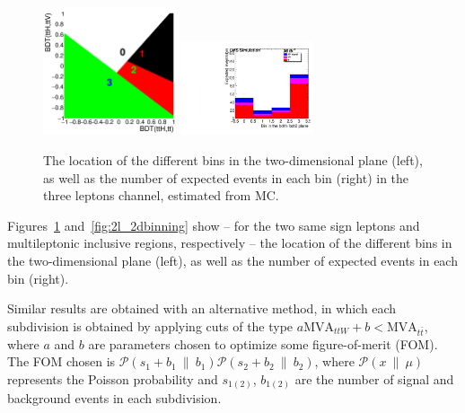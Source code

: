 \begin{figure}[htb]
	\centering
        \includegraphics[width=0.35\textwidth]{plots_extraction/binning/3l/voronoi_3l}
        \includegraphics[width=0.35\textwidth,height=0.35\textwidth]{plots_extraction/binning/3l/recursive_3l}
        \caption{The location of the different bins in the two-dimensional plane (left), as well as the number of expected events in each bin (right) in the three leptons channel, estimated from MC.}
	\label{fig:3l_2dbinning}
\end{figure}

Figures~\ref{fig:3l_2dbinning} and~\ref{fig:2l_2dbinning} show -- for the two same sign leptons and multileptonic inclusive regions, respectively -- the location of the different bins in the two-dimensional plane (left), as well as the number of expected events in each bin (right).

Similar results are obtained with an alternative method, in which each
subdivision is obtained by applying cuts of the type $a \textrm{MVA}_{ttW} + b < \textrm{MVA}_{t\bar{t}}$,
where $a$ and $b$ are parameters chosen to optimize some figure-of-merit (FOM). The FOM chosen
is $\mathcal{P}(s_1 + b_1\ \| \ b_1)  \mathcal{P}(s_2 + b_2\ \| \ b_2)$, where $\mathcal{P}(x\ \| \ \mu)$
represents the Poisson probability and $s_{1(2)}$, $b_{1(2)}$ are the number of signal and background events in each subdivision.

